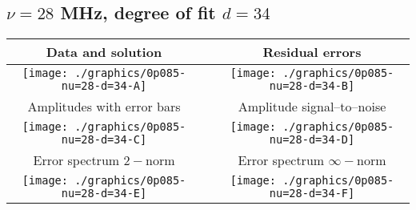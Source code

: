 

% 

\clearpage{}
\break{}

\subsection{$\nu = 28$ MHz, degree of fit $d = 34$}

\begin{table}[h]
    \begin{center}
        \begin{tabular}{ccc}
            Data and solution & \quad & Residual errors \\\hline
            \texttt{[image: ./graphics/0p085-nu=28-d=34-A]} &&
            \texttt{[image: ./graphics/0p085-nu=28-d=34-B]} \\[15pt]
            Amplitudes with error bars && Amplitude signal--to--noise \\\hline
            \texttt{[image: ./graphics/0p085-nu=28-d=34-C]} &&
            \texttt{[image: ./graphics/0p085-nu=28-d=34-D]} \\[15pt]
            Error spectrum $2-$norm && Error spectrum $\infty-$norm \\\hline
            \texttt{[image: ./graphics/0p085-nu=28-d=34-E]} &&
            \texttt{[image: ./graphics/0p085-nu=28-d=34-F]} \\[15pt]
        \end{tabular}
    \end{center}
\label{fig:elev=85, nu=28}
\end{table}



\endinput
